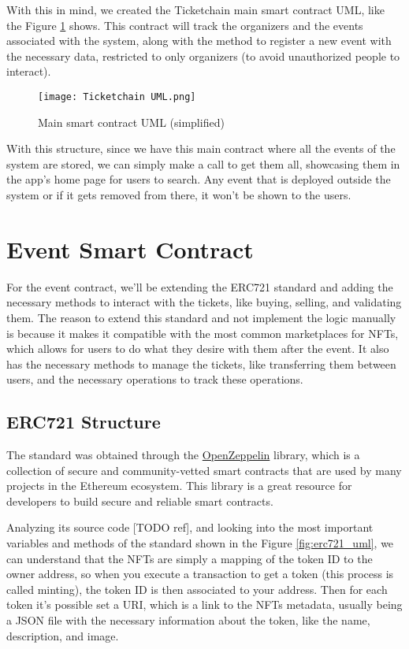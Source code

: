 With this in mind, we created the Ticketchain main smart contract UML, like the
Figure \ref{fig:system_uml} shows. This contract will track the organizers and
the events associated with the system, along with the method to register a new
event with the necessary data, restricted to only organizers (to avoid
unauthorized people to interact).

\begin{figure}[H]
	\texttt{[image: Ticketchain UML.png]}
	\centering
	\caption{Main smart contract UML (simplified)}
	\label{fig:system_uml}
\end{figure}

With this structure, since we have this main contract where all the events of
the system are stored, we can simply make a call to get them all, showcasing
them in the app's home page for users to search. Any event that is deployed
outside the system or if it gets removed from there, it won't be shown to the
users.

\section{Event Smart Contract}
\label{sec:event_smart_contract}

For the event contract, we'll be extending the ERC721 standard and adding the
necessary methods to interact with the tickets, like buying, selling, and
validating them. The reason to extend this standard and not implement the logic
manually is because it makes it compatible with the most common marketplaces
for NFTs, which allows for users to do what they desire with them after the
event. It also has the necessary methods to manage the tickets, like
transferring them between users, and the necessary operations to track these
operations.

\subsection{ERC721 Structure}
\label{subsec:erc721_structure}

The standard was obtained through the
\href{https://docs.openzeppelin.com/contracts/api/token/erc721#ERC721}{OpenZeppelin}
library, which is a collection of secure and community-vetted smart contracts
that are used by many projects in the Ethereum ecosystem. This library is a
great resource for developers to build secure and reliable smart contracts.

Analyzing its source code [TODO ref], and looking into the most important
variables and methods of the standard shown in the Figure \ref{fig:erc721_uml},
we can understand that the NFTs are simply a mapping of the token ID to the
owner address, so when you execute a transaction to get a token (this process
is called minting), the token ID is then associated to your address. Then for
each token it's possible set a URI, which is a link to the NFTs metadata,
usually being a JSON file with the necessary information about the token, like
the name, description, and image.

